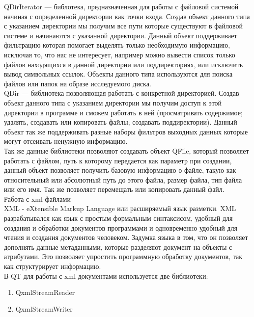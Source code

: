 QDirIterator — библотека, предназначенная для работы с файловой системой начиная с определенной директории как точки входа. Создав объект данного типа с указанием директории мы получим все пути которые существуют в файловой системе и начинаются с указанной директории. Данный объект поддерживает фильтрацию которая помогает выделять только необходимую информацию, исключая то, что нас не интересует, например можно вывести список только файлов находящихся в данной директории или поддиректориях, или исключить вывод символьных ссылок. Объекты данного типа используются для поиска файлов или папок на образе исследуемого диска. \\

QDir — библиотека позволяющая работать с конкретной директорией. Создав объект данного типа с указанием директории мы получим доступ к этой директории в программе и сможем работать в ней (просматривать содержимое; удалять, создавать или копировать файлы; создавать поддиректории). Данный объект так же поддерживать разные наборы фильтров выходных данных которые могут отсеивать ненужную информацию. \\

Так же данные библиотеки позволяют создавать объект QFile, который позволяет работать с файлом, путь к которому передается как параметр при создании, данный объект позволяет получить базовую информацию о файле, такую как относительный или абсолютный путь до этого файла, размер файла, тип файла или его имя. Так же позволяет перемещать или копировать данный файл.\\

Работа с xml-файлами \\

XML - eXtensible Markup Language или расширяемый язык разметки. XML разрабатывался как язык с простым формальным синтаксисом, удобный для создания и обработки документов программами и одновременно удобный для чтения и создания документов человеком. Задумка языка в том, что он позволяет дополнять данные метаданными, которые разделяют документ на объекты с атрибутами. Это позволяет упростить программную обработку документов, так как структурирует информацию. \\

В QT для работы с xml-документами используется две библиотеки: \\

\begin{enumerate}
\item QxmlStreamReader
\item QxmlStreamWriter
\end{enumerate}

